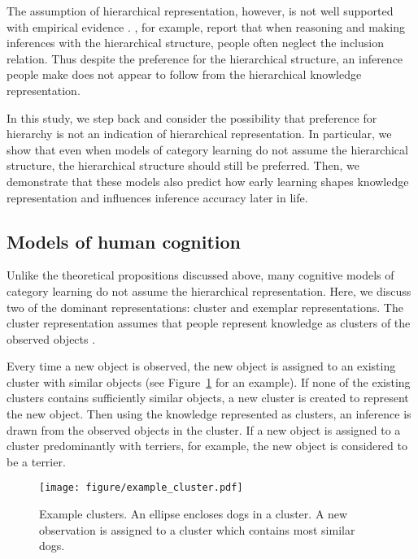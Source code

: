 \documentclass[doc]{apa6}
\begin{document}
The assumption of hierarchical representation, however, is not well supported with empirical
evidence \parencite[see][for review]{Murphy1997a}. \textcite{Sloman1998a}, for example, report that
when reasoning and making inferences with the hierarchical structure, people often neglect the
inclusion relation. Thus despite the preference for the hierarchical structure, an inference people
make does not appear to follow from the hierarchical knowledge representation.

In this study, we step back and consider the possibility that preference for hierarchy is not an
indication of hierarchical representation.  In particular, we show that even when models of category
learning do not assume the hierarchical structure, the hierarchical structure should still be
preferred.  Then, we demonstrate that these models also predict how early learning shapes knowledge
representation and influences inference accuracy later in life.


\subsection*{Models of human cognition}

Unlike the theoretical propositions discussed above, many cognitive models of category learning do
not assume the hierarchical representation. Here, we discuss two of the dominant representations:
cluster and exemplar representations. The cluster representation assumes that people represent
knowledge as clusters of the observed objects \parencite[e.g.,][]{Anderson1991a, Love2004a,
Sanborn2010a}.

Every time a new object is observed, the new object is assigned to an existing cluster with similar
objects (see Figure~\ref{fig:cluster} for an example). If none of the existing clusters contains
sufficiently similar objects, a new cluster is created to represent the new object.  Then using the
knowledge represented as clusters, an inference is drawn from the observed objects in the cluster.
If a new object is assigned to a cluster predominantly with terriers, for example, the new object is
considered to be a terrier.

\begin{figure}
    \centering

    \texttt{[image: figure/example\_cluster.pdf]}
    \vspace{6pt}

    \caption{Example clusters. An ellipse encloses dogs in a cluster. A new observation is assigned
    to a cluster which contains most similar dogs.}

\label{fig:cluster}
\end{figure}
\end{document}
